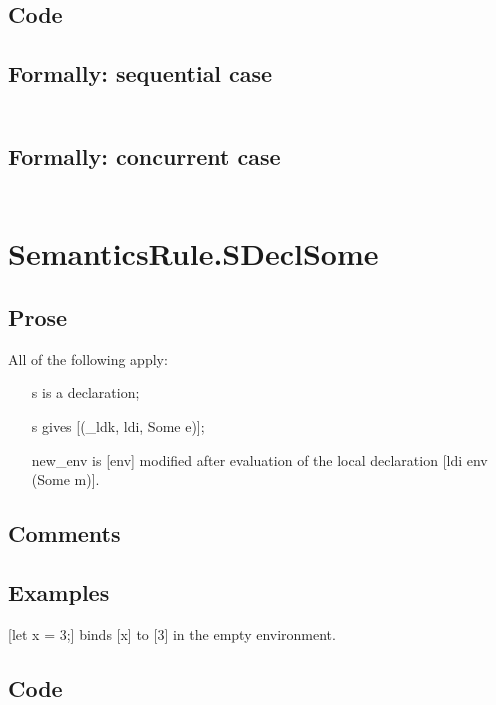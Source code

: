 \documentclass{book}
\begin{document}
  \subsection{Code}

  \subsection{Formally: sequential case}
  \begin{align}
  \end{align} 

  \subsection{Formally: concurrent case}
  \begin{align}
  \end{align} 

\section{SemanticsRule.SDeclSome \label{sec:SemanticsRule.SDeclSome}}

    \subsection{Prose}
    All of the following apply:
    \begin{itemize}
    \item [s] is a declaration;
    \item [s] gives [(\_ldk, ldi, Some e)];
    \item [new\_env] is [env] modified after evaluation of the local declaration
      [ldi env (Some m)].
    \end{itemize}

    \subsection{Comments}

    \subsection{Examples}
    [let x = 3;] binds [x] to [3] in the empty environment.

  \subsection{Code}
\end{document}
